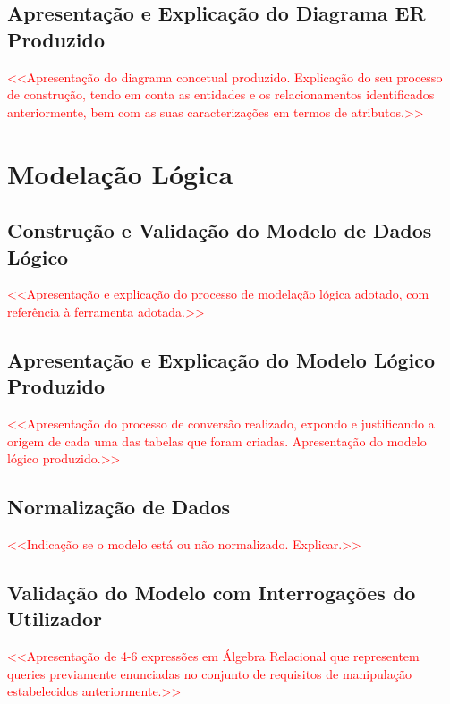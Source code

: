 \documentclass[a4paper,12pt]{scrreprt}
\begin{document}
    \section{Apresentação e Explicação do Diagrama ER Produzido}
        \textcolor{red}{
            <<Apresentação do diagrama concetual produzido. Explicação do seu processo de construção, tendo em conta as entidades e os relacionamentos identificados anteriormente, bem com as suas caracterizações em termos de atributos.>>
        }



\chapter{Modelação Lógica}
    \section{Construção e Validação do Modelo de Dados Lógico}
        \textcolor{red}{
            <<Apresentação e explicação do processo de modelação lógica adotado, com referência à ferramenta adotada.>>
        }
    \section{Apresentação e Explicação do Modelo Lógico Produzido}
        \textcolor{red}{
            <<Apresentação do processo de conversão realizado, expondo e justificando a origem de cada uma das tabelas que foram criadas. Apresentação do modelo lógico produzido.>>
        }
    \section{Normalização de Dados}
        \textcolor{red}{
            <<Indicação se o modelo está ou não normalizado. Explicar.>>
        }
    \section{Validação do Modelo com Interrogações do Utilizador}
        \textcolor{red}{
            <<Apresentação de 4-6 expressões em Álgebra Relacional que representem queries previamente enunciadas no conjunto de requisitos de manipulação estabelecidos anteriormente.>>
        }
\end{document}
